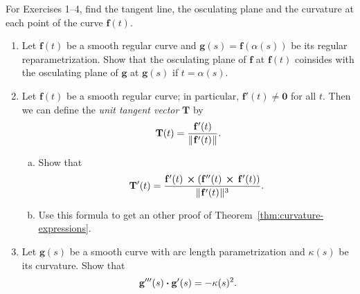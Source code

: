 \startexercises\label{sec1dot9}
\par\noindent For Exercises 1--4, 
find the tangent line, 
the osculating plane and the curvature at each point of the curve  $\mathbf{f}(t)$.
\begin{enumerate}[\bfseries 1.]


  
[{[\bfseries 1.]}]
  \item Let $\mathbf{f}(t)$ be a smooth regular curve and $\mathbf{g}(s)=\mathbf{f}(\alpha(s))$ be its regular reparametrization. Show that the osculating plane of $\mathbf{f}$ at $\mathbf{f}(t)$ coinsides with the osculating plane of $\mathbf{g}$ at $\mathbf{g}(s)$ if $t=\alpha(s)$.  
  
   \item Let $\mathbf{f}(t)$ be a smooth regular curve; in particular, $\mathbf{f}'(t) \ne \mathbf{0}$ for all $t$. Then we can
  define the \emph{unit tangent vector} $\mathbf{T}$ by
  \begin{displaymath}
   \mathbf{T}(t) = \dfrac{\mathbf{f}'(t)}{\lVert\mspace{1mu}\mathbf{f}'(t)\mspace{1mu}\rVert} .
  \end{displaymath}
   \begin{enumerate}[(a)]
  \item 
  Show that
  \begin{displaymath}
   \mathbf{T}'(t) = \dfrac{\mathbf{f}'(t)\, \bm{\times} (\mathbf{f}''(t)\, \bm{\times} \,\mathbf{f}'(t))}{
    \lVert\mspace{1mu}\mathbf{f}'(t)\mspace{1mu}\rVert^3} .
  \end{displaymath}
  \item Use this formula to get an other proof of Theorem~\ref{thm:curvature-expressions}.
   \end{enumerate}
   \item\label{ex:g'''} Let $\mathbf{g}(s)$ be a smooth curve with arc length parametrization and $\kappa(s)$ be its curvature.
  Show that 
  \[\mathbf{g}'''(s) \bm{\cdot} \mathbf{g}'(s)=-\kappa(s)^2.\]
  

\end{enumerate}

